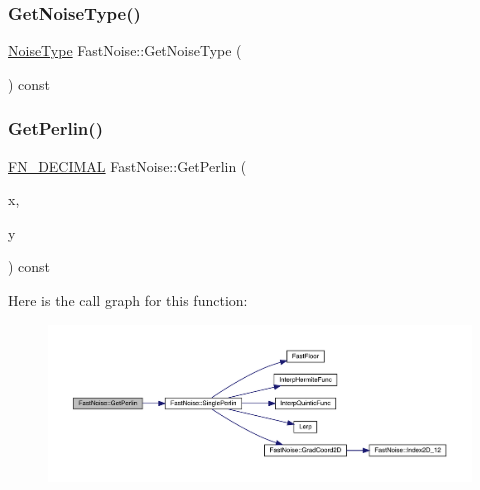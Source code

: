 \subsubsection{\texorpdfstring{Get\+Noise\+Type()}{GetNoiseType()}}
{\footnotesize\ttfamily \mbox{\hyperlink{class_fast_noise_a77adcfdc4d6e9410ef6099553509d09f}{Noise\+Type}} Fast\+Noise\+::\+Get\+Noise\+Type (\begin{DoxyParamCaption}{ }\end{DoxyParamCaption}) const\hspace{0.3cm}{\ttfamily [inline]}}

\mbox{\label{class_fast_noise_aa511d58e188f47cf4fd7fa83164e7a0b}} 
\subsubsection{\texorpdfstring{Get\+Perlin()}{GetPerlin()}\hspace{0.1cm}{\footnotesize\ttfamily [1/2]}}
{\footnotesize\ttfamily \mbox{\hyperlink{_fast_noise_8h_a75a9ef6d2541c4921815b885bfd449c3}{F\+N\+\_\+\+D\+E\+C\+I\+M\+AL}} Fast\+Noise\+::\+Get\+Perlin (\begin{DoxyParamCaption}\item[{\mbox{\hyperlink{_fast_noise_8h_a75a9ef6d2541c4921815b885bfd449c3}{F\+N\+\_\+\+D\+E\+C\+I\+M\+AL}}}]{x,  }\item[{\mbox{\hyperlink{_fast_noise_8h_a75a9ef6d2541c4921815b885bfd449c3}{F\+N\+\_\+\+D\+E\+C\+I\+M\+AL}}}]{y }\end{DoxyParamCaption}) const}

Here is the call graph for this function\+:
\nopagebreak
\begin{figure}[H]
\begin{center}
\leavevmode
\includegraphics[width=350pt]{class_fast_noise_aa511d58e188f47cf4fd7fa83164e7a0b_cgraph}
\end{center}
\end{figure}
\mbox{\label{class_fast_noise_ac8379b662e050faf5302026616fc56af}} 
